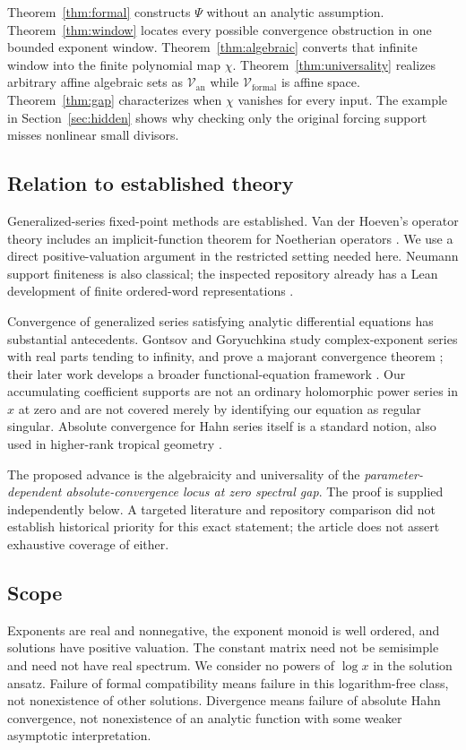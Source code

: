 \documentclass[11pt,a4paper]{article}
\numberwithin{equation}{section}
\theoremstyle{definition}
\theoremstyle{remark}
\newcommand{\cV}{\mathcal V}
\begin{document}
Theorem~\ref{thm:formal} constructs $\Psi$ without an analytic assumption.
Theorem~\ref{thm:window} locates every possible convergence obstruction in
one bounded exponent window. Theorem~\ref{thm:algebraic} converts that
infinite window into the finite polynomial map $\chi$.
Theorem~\ref{thm:universality} realizes arbitrary affine algebraic sets as
$\cV_{\mathrm{an}}$ while $\cV_{\mathrm{formal}}$ is affine space.
Theorem~\ref{thm:gap} characterizes when $\chi$ vanishes for every input.
The example in Section~\ref{sec:hidden} shows why checking only the original
forcing support misses nonlinear small divisors.

\subsection{Relation to established theory}
Generalized-series fixed-point methods are established. Van der Hoeven's
operator theory includes an implicit-function theorem for Noetherian
operators \cite{vdh}. We use a direct positive-valuation argument in the
restricted setting needed here. Neumann support finiteness is also
classical; the inspected repository already has a Lean development of
finite ordered-word representations \cite{repo-words}.

Convergence of generalized series satisfying analytic differential equations
has substantial antecedents. Gontsov and Goryuchkina study complex-exponent
series with real parts tending to infinity, and prove a majorant convergence
theorem \cite{gg2015}; their later work develops a broader functional-equation
framework \cite{gg2024}. Our accumulating coefficient supports are not an
ordinary holomorphic power series in $x$ at zero and are not covered merely
by identifying our equation as regular singular. Absolute convergence for
Hahn series itself is a standard notion, also used in higher-rank tropical
geometry \cite{js2023}.

The proposed advance is the algebraicity and universality of the
\emph{parameter-dependent absolute-convergence locus at zero spectral gap}.
The proof is supplied independently below. A targeted literature and
repository comparison did not establish historical priority for this exact
statement; the article does not assert exhaustive coverage of either.

\subsection{Scope}
Exponents are real and nonnegative, the exponent monoid is well ordered,
and solutions have positive valuation. The constant matrix need not be
semisimple and need not have real spectrum. We consider no powers of
$\log x$ in the solution ansatz. Failure of formal compatibility means
failure in this logarithm-free class, not nonexistence of other solutions.
Divergence means failure of absolute Hahn convergence, not nonexistence of
an analytic function with some weaker asymptotic interpretation.
\end{document}
